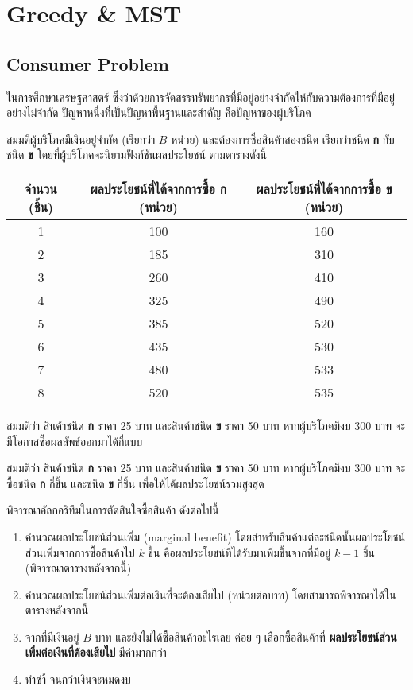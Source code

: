 \chapter{Greedy \& MST}

\newcommand{\bene}{\mathsf{B}}
\newcommand{\mb}{\mathsf{MB}}
\section{Consumer Problem}

ในการศึกษาเศรษฐศาสตร์ ซึ่งว่าด้วยการจัดสรรทรัพยากรที่มีอยู่อย่างจำกัดให้กับความต้องการที่มีอยู่อย่างไม่จำกัด ปัญหาหนึ่งที่เป็นปัญหาพื้นฐานและสำคัญ คือปัญหาของผู้บริโภค

สมมติผู้บริโภคมีเงินอยู่จำกัด (เรียกว่า $B$ หน่วย) และต้องการซื้อสินค้าสองชนิด เรียกว่าชนิด \textbf{ก} กับชนิด \textbf{ข} โดยที่ผู้บริโภคจะนิยามฟังก์ชันผลประโยชน์ ตามตารางดังนี้

\begin{center}
\begin{tabular}{|c|c|c|}
\hline
จำนวน (ชิ้น) & ผลประโยชน์ที่ได้จากการซื้อ \textbf{ก} (หน่วย) & ผลประโยชน์ที่ได้จากการซื้อ \textbf{ข} (หน่วย) \\
\hline
1 & 100 & 160 \\
2 & 185 & 310 \\
3 & 260 & 410 \\
4 & 325 & 490 \\
5 & 385 & 520 \\
6 & 435 & 530 \\
7 & 480 & 533 \\
8 & 520 & 535 \\
\hline
\end{tabular}
\end{center}

\begin{exercise}
สมมติว่า สินค้าชนิด \textbf{ก} ราคา 25 บาท และสินค้าชนิด \textbf{ข} ราคา 50 บาท หากผู้บริโภคมีงบ 300 บาท จะมีโอกาสซื้อผลลัพธ์ออกมาได้กี่แบบ
\end{exercise}

\begin{exercise}
สมมติว่า สินค้าชนิด \textbf{ก} ราคา 25 บาท และสินค้าชนิด \textbf{ข} ราคา 50 บาท หากผู้บริโภคมีงบ 300 บาท จะซื้อชนิด \textbf{ก} กี่ชิ้น และชนิด \textbf{ข} กี่ชิ้น เพื่อให้ได้ผลประโยชน์รวมสูงสุด
\end{exercise}

พิจารณาอัลกอริทึมในการตัดสินใจซื้อสินค้า ดังต่อไปนี้
\begin{enumerate}[nosep]
    \item คำนวณผลประโยชน์ส่วนเพิ่ม (marginal benefit) โดยสำหรับสินค้าแต่ละชนิดนั้นผลประโยชน์ส่วนเพิ่มจากการซื้อสินค้าไป $k$ ชิ้น คือผลประโยชน์ที่ได้รับมาเพิ่มขึ้นจากที่มีอยู่ $k-1$ ชิ้น (พิจารณาตารางหลังจากนี้)
    \item คำนวณผลประโยชน์ส่วนเพิ่มต่อเงินที่จะต้องเสียไป (หน่วยต่อบาท) โดยสามารถพิจารณาได้ในตารางหลังจากนี้
    \item จากที่มีเงินอยู่ $B$ บาท และยังไม่ได้ซื้อสินค้าอะไรเลย ค่อย ๆ เลือกซื้อสินค้าที่ \textbf{ผลประโยชน์ส่วนเพิ่มต่อเงินที่ต้องเสียไป} มีค่ามากกว่า
    \item ทำซำ้ จนกว่าเงินจะหมดงบ
\end{enumerate}

